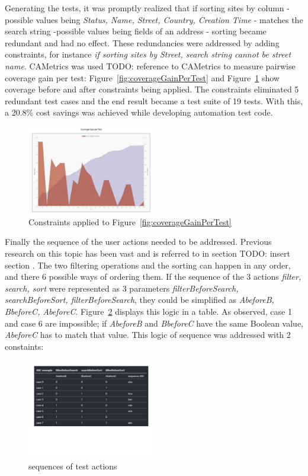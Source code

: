 \documentclass[conference]{IEEEtran}
\newcommand{\todo}[1]{}
\renewcommand{\todo}[1]{{\color{red} TODO: {#1}}}
\begin{document}
	Generating the tests, it was promptly realized that if sorting sites by column - possible values being \textit{Status, Name, Street, Country, Creation Time} - matches the search string -possible values being fields of an address - sorting became redundant and had no effect.
	These redundancies were addressed by adding constraints, for instance \textit{if sorting sites by Street, search string cannot be street name}. 
	CAMetrics was used \todo{reference to CAMetrics} to measure pairwise coverage gain per test: Figure~\ref{fig:coverageGainPerTest} and Figure~\ref{fig:coverageGainPerTest_withConstraints} show coverage before and after constraints being applied.
	The constraints eliminated 5 redundant test cases and the end result became a test suite of 19 tests. With this, a 20.8\% cost savings was achieved while developing automation test code.
	
	\begin{figure}[!h]
		\includegraphics[width=0.50\textwidth,]{coverageGainPerTest_withConstraints.pdf}
		\caption{Constraints applied to Figure~\ref{fig:coverageGainPerTest}}
		\label{fig:coverageGainPerTest_withConstraints}
	\end{figure}

	\newpage
	Finally the sequence of the user actions needed to be addressed. Previous research on this topic has been vast and is referred to in section \todo{insert section} .
	The two filtering operations and the sorting can happen in any order, and there 6 possible ways of ordering them.
	If the sequence of the 3 actions \textit{filter, search, sort} were represented as 3 parameters \textit{filterBeforeSearch, searchBeforeSort, filterBeforeSearch}, they could be simplified as \textit{AbeforeB, BbeforeC, AbeforeC}.
	Figure~\ref{fig:sorting} displays this logic in a table.
	As observed, case 1 and case 6 are impossible; if \textit{AbeforeB} and \textit{BbeforeC} have the same Boolean value, \textit{AbeforeC} has to match that value.
	This logic of sequence was addressed with 2 constaints:

	\begin{figure}[!h]
		\includegraphics[width=0.50\textwidth,]{sorting.pdf}
		\caption{sequences of test actions}
		\label{fig:sorting}
	\end{figure}
\end{document}
